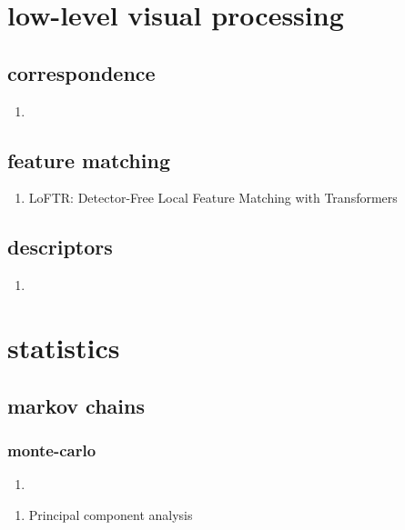 \documentclass[acmlarge]{acmart}
\begin{document}
\section{low-level visual processing}
	\subsection{correspondence}
	\begin{enumerate}
		\item
	\end{enumerate}
	\subsection{feature matching}
	\begin{enumerate}
		\item LoFTR: Detector-Free Local Feature Matching with Transformers \cite{Sun2021LoFTRDL} 

	\end{enumerate}
	\subsection{descriptors}
	\begin{enumerate}
		\item
	\end{enumerate}
\begin{enumerate}
\end{enumerate}
\section{statistics}
	\subsection{markov chains}
		\subsubsection{monte-carlo}
		\begin{enumerate}
			\item
		\end{enumerate}
	\begin{enumerate}
	\end{enumerate}
\begin{enumerate}
	\item Principal component analysis \cite{Wold1987PrincipalCA} 

\end{enumerate}
\end{document}

